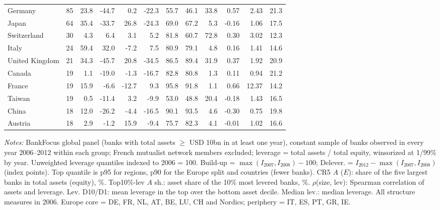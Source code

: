 \begin{table}[htbp]
\begin{threeparttable}
\begin{tabular}{lrrrrrrrrrrr}
Germany & 85 & 23.8 & -44.7 & 0.2 & -22.3 & 55.7 & 46.1 & 33.8 & 0.57 & 2.43 & 21.3 \\
Japan & 64 & 35.4 & -33.7 & 26.8 & -24.3 & 69.0 & 67.2 & 5.3 & -0.16 & 1.06 & 17.5 \\
Switzerland & 30 & 4.3 & 6.4 & 3.1 & 5.2 & 81.8 & 60.7 & 72.8 & 0.30 & 3.02 & 12.3 \\
Italy & 24 & 59.4 & 32.0 & -7.2 & 7.5 & 80.9 & 79.1 & 4.8 & 0.16 & 1.41 & 14.6 \\
United Kingdom & 21 & 34.3 & -45.7 & 20.8 & -34.5 & 86.5 & 89.4 & 31.9 & 0.37 & 1.92 & 20.9 \\
Canada & 19 & 1.1 & -19.0 & -1.3 & -16.7 & 82.8 & 80.8 & 1.3 & 0.11 & 0.94 & 21.2 \\
France & 19 & 15.9 & -6.6 & -12.7 & 9.3 & 95.8 & 91.8 & 1.1 & 0.66 & 12.37 & 14.2 \\
Taiwan & 19 & 0.5 & -11.4 & 3.2 & -9.9 & 53.0 & 48.8 & 20.4 & -0.18 & 1.43 & 16.5 \\
China & 18 & 12.0 & -26.2 & -4.4 & -16.5 & 90.1 & 93.5 & 4.6 & -0.30 & 0.75 & 19.8 \\
Austria & 18 & 2.9 & -1.2 & 15.9 & -9.4 & 75.7 & 82.3 & 4.1 & -0.01 & 1.02 & 16.6 \\
\bottomrule
\end{tabular}
\begin{tablenotes}[flushleft]
\footnotesize
\item \textit{Notes:} BankFocus global panel (banks with total assets $\geq$ USD 10bn in at least one year), constant sample of banks observed in every year 2006--2012 within each group; French mutualist network members excluded; leverage = total assets / total equity, winsorized at 1/99\% by year. Unweighted leverage quantiles indexed to 2006 = 100. Build-up = $\max(I_{2007}, I_{2008}) - 100$; Delever. = $I_{2012} - \max(I_{2007}, I_{2008})$ (index points). Top quantile is p95 for regions, p90 for the Europe split and countries (fewer banks). CR5 $A$ ($E$): share of the five largest banks in total assets (equity), \%. Top10\%-lev $A$ sh.: asset share of the 10\% most levered banks, \%. $\rho$(size, lev): Spearman correlation of assets and leverage. Lev. D10/D1: mean leverage in the top over the bottom asset decile. Median lev.: median leverage. All structure measures in 2006. Europe core = DE, FR, NL, AT, BE, LU, CH and Nordics; periphery = IT, ES, PT, GR, IE.
\end{tablenotes}
\end{threeparttable}
\end{table}
